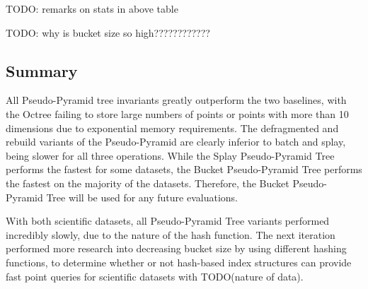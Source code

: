 TODO: remarks on stats in above table

TODO: why is bucket size so high????????????

\subsection{Summary}

All Pseudo-Pyramid tree invariants greatly outperform the two baselines, with the Octree failing to store large numbers of points or points with more than 10 dimensions due to exponential memory requirements. The defragmented and rebuild variants of the Pseudo-Pyramid are clearly inferior to batch and splay, being slower for all three operations. While the Splay Pseudo-Pyramid Tree performs the fastest for some datasets, the Bucket Pseudo-Pyramid Tree performs the fastest on the majority of the datasets. Therefore, the Bucket Pseudo-Pyramid Tree will be used for any future evaluations.

With both scientific datasets, all Pseudo-Pyramid Tree variants performed incredibly slowly, due to the nature of the hash function. The next iteration performed more research into decreasing bucket size by using different hashing functions, to determine whether or not hash-based index structures can provide fast point queries for scientific datasets with TODO(nature of data).